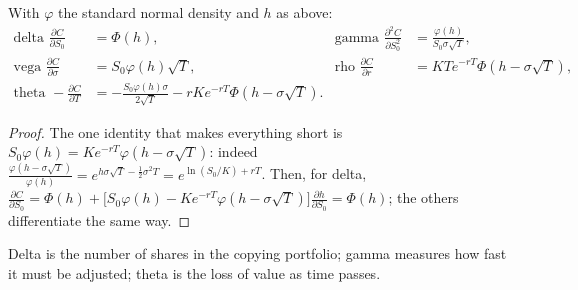 \begin{result}
\label{res:greeks}
With $\varphi$ the standard normal density and $h$ as above:
\[
  \begin{aligned}
  \text{delta }\frac{\partial C}{\partial S_0}&=\Phi(h), &\text{gamma }\frac{\partial^2C}{\partial S_0^2}&=\frac{\varphi(h)}{S_0\sigma\sqrt T},\\
  \text{vega }\frac{\partial C}{\partial\sigma}&=S_0\varphi(h)\sqrt T, &\text{rho }\frac{\partial C}{\partial r}&=KTe^{-rT}\Phi(h-\sigma\sqrt T),\\
  \text{theta }-\frac{\partial C}{\partial T}&=-\frac{S_0\varphi(h)\sigma}{2\sqrt T}-rKe^{-rT}\Phi(h-\sigma\sqrt T).
  \end{aligned}
\]
\end{result}
\begin{proof}
The one identity that makes everything short is $S_0\varphi(h)=Ke^{-rT}\varphi(h-\sigma\sqrt T)$: indeed $\frac{\varphi(h-\sigma\sqrt T)}{\varphi(h)}=e^{h\sigma\sqrt T-\frac12\sigma^2T}=e^{\ln(S_0/K)+rT}$. Then, for delta, $\frac{\partial C}{\partial S_0}=\Phi(h)+\big[S_0\varphi(h)-Ke^{-rT}\varphi(h-\sigma\sqrt T)\big]\frac{\partial h}{\partial S_0}=\Phi(h)$; the others differentiate the same way.
\end{proof}

Delta is the number of shares in the copying portfolio; gamma measures how fast it must be adjusted; theta is the loss of value as time passes.


